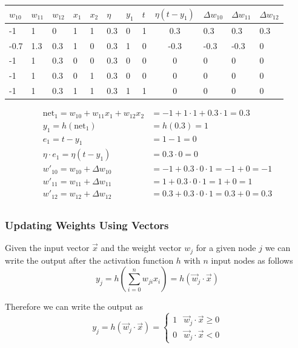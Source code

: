 \documentclass[11pt]{article}
\begin{document}
\begin{tabularx}{\linewidth}{XXXXXXXXcXXX}
    \hline
    $w_{10}$ & $w_{11}$ & $w_{12}$ & $x_1$ & $x_2$ & $\eta$ & $y_1$ & $t$ & $\eta (t-y_1)$ & $\Delta w_{10}$ & $\Delta w_{11}$ & $\Delta w_{12}$\\
    \hline
    -1 & 1 & 0 & 1 & 1 & 0.3 & 0 & 1 & 0.3 & 0.3 & 0.3 & 0.3\\
    \hline
    -0.7 & 1.3 & 0.3 & 1 & 0 & 0.3 & 1 & 0 & -0.3 & -0.3 & -0.3 & 0\\
    \hline
    -1 & 1 & 0.3 & 0 & 0 & 0.3 & 0 & 0 & 0 & 0 & 0 & 0\\
    \hline
    -1 & 1 & 0.3 & 0 & 1 & 0.3 & 0 & 0 & 0 & 0 & 0 & 0\\
    \hline
    -1 & 1 & 0.3 & 1 & 1 & 0.3 & 1 & 1 & 0 & 0 & 0 & 0\\
    \hline
\end{tabularx}

\begin{align*}
\text{net}_1 = w_{10} + w_{11}x_1 + w_{12}x_2 &= -1 + 1 \cdot 1 + 0.3 \cdot 1 = 0.3\\
y_1 = h(\text{net}_1) &= h(0.3) = 1\\
e_1 = t - y_1 &= 1 - 1 = 0\\
\eta \cdot e_1 = \eta (t - y_1) &= 0.3\cdot 0 = 0\\
w'_{10} = w_{10} + \Delta w_{10} &= -1 + 0.3\cdot 0 \cdot 1 = -1 + 0 = -1\\
w'_{11} = w_{11} + \Delta w_{11} &= 1 + 0.3\cdot 0 \cdot 1 = 1 + 0 = 1 \\
w'_{12} = w_{12} + \Delta w_{12} &= 0.3 + 0.3\cdot 0 \cdot 1 = 0.3 + 0 = 0.3 \\
\end{align*}

\subsubsection{Updating Weights Using Vectors}

Given the input vector $\vec{x}$ and the weight vector $w_j$ for a given node $j$ we can write the output after the activation function $h$ with $n$ input nodes as follows
\begin{equation}
    y_j = h\left( \sum_{i=0}^{n} w_{ji} x_i \right) = h(\vec{w}_j \cdot \vec{x})
\end{equation}

\noindent
Therefore we can write the output as
\begin{equation}
y_j = h(\vec{w}_j \cdot \vec{x}) = \left\{ \begin{matrix} 1 & \vec{w}_j \cdot \vec{x} \geq 0\\ 0 & \vec{w}_j \cdot \vec{x} < 0 \end{matrix} \right.
\end{equation}
\end{document}
